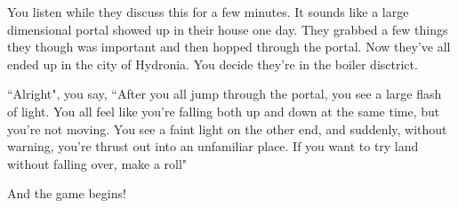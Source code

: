 You listen while they discuss this for a few minutes. It sounds like a large
dimensional portal showed up in their house one day. They grabbed a few things
they though was important and then hopped through the portal. Now they've all
ended up in the city of Hydronia. You decide they're in the boiler disctrict.

``Alright", you say, ``After you all jump through the portal, you see a large
flash of light. You all feel like you're falling both up and down at the same
time, but you're not moving. You see a faint light on the other end, and
suddenly, without warning, you're thrust out into an unfamiliar place. If you
want to try land without falling over, make a roll"

And the game begins!
